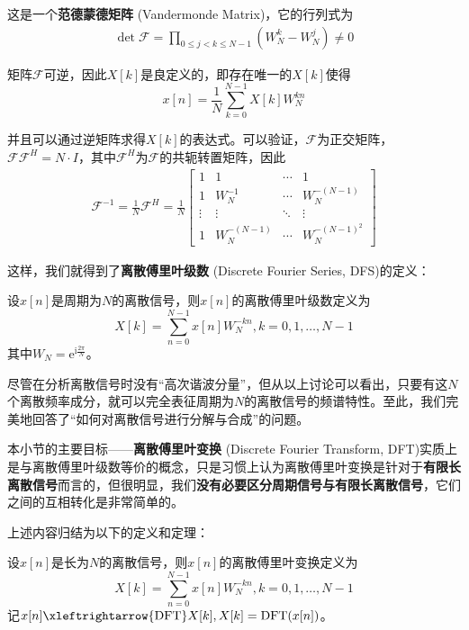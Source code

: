 这是一个\textbf{范德蒙德矩阵} (Vandermonde Matrix)，它的行列式为
\begin{align*}
    \det\mathcal{F}=\prod_{0\leq j<k\leq N-1}(W_N^k-W_N^j)\neq 0
\end{align*}

矩阵$\mathcal{F}$可逆，因此$X[k]$是良定义的，即存在唯一的$X[k]$使得
\[x[n]=\frac{1}{N}\sum_{k=0}^{N-1}X[k]W_N^{kn}\]

并且可以通过逆矩阵求得$X[k]$的表达式。可以验证，$\mathcal{F} $为正交矩阵，$\mathcal{F} \mathcal{F} ^H=N\cdot I$，其中$\mathcal{F} ^H$为$\mathcal{F} $的共轭转置矩阵，因此
\begin{align*}
    \mathcal{F} ^{-1}=\frac{1}{N}\mathcal{F} ^H=\frac{1}{N}\begin{bmatrix}1 & 1 & \cdots & 1 \\
    1 & W_N^{-1} & \cdots & W_N^{-(N-1)} \\
    \vdots & \vdots & \ddots & \vdots \\
    1 & W_N^{-(N-1)} & \cdots & W_N^{-(N-1)^2}
    \end{bmatrix}
\end{align*}

这样，我们就得到了\textbf{离散傅里叶级数} (Discrete Fourier Series, DFS)的定义：
\begin{definition}[离散傅里叶级数]
    设$x[n]$是周期为$N$的离散信号，则$x[n]$的离散傅里叶级数定义为
    \[X[k]=\sum_{n=0}^{N-1}x[n]W_N^{-kn},k=0,1,\dots,N-1\]
    其中$W_N=\mathrm{e}^{\mathrm{i}\frac{2\pi}{N}}$。
\end{definition}

尽管在分析离散信号时没有“高次谐波分量”，但从以上讨论可以看出，只要有这$N$个离散频率成分，就可以完全表征周期为$N$的离散信号的频谱特性。至此，我们完美地回答了“如何对离散信号进行分解与合成”的问题。

本小节的主要目标——\textbf{离散傅里叶变换} (Discrete Fourier Transform, DFT)实质上是与离散傅里叶级数等价的概念，只是习惯上认为离散傅里叶变换是针对于\textbf{有限长离散信号}而言的\cite{dsp}，但很明显，我们\textbf{没有必要区分周期信号与有限长离散信号}，它们之间的互相转化是非常简单的。

上述内容归结为以下的定义和定理：

\begin{definition}[离散傅里叶变换]
    设$x[n]$是长为$N$的离散信号，则$x[n]$的离散傅里叶变换定义为
    \[X[k]=\sum_{n=0}^{N-1}x[n]W_N^{-kn},k=0,1,\dots,N-1\]
    记$x[n]\xleftrightarrow{\text{DFT}}X[k],X[k]=\text{DFT}(x[n])$。
\end{definition}

